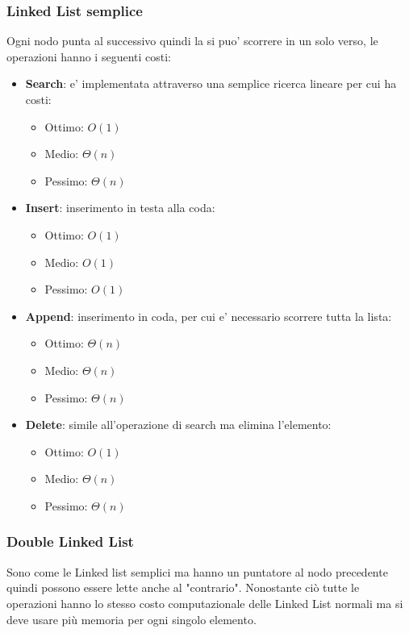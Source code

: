 \documentclass{article}
\begin{document}
\subsubsection{Linked List semplice}
Ogni nodo punta al successivo quindi la si puo' scorrere in un solo verso, le operazioni hanno i seguenti costi: \begin{itemize}
    \item \textbf{Search}: e' implementata attraverso una semplice ricerca lineare per cui ha costi:
    \begin{itemize}
        \item Ottimo: $O(1)$
        \item Medio: $\Theta (n)$
        \item Pessimo: $\Theta(n)$
    \end{itemize}
    \item \textbf{Insert}: inserimento in testa alla coda:
    \begin{itemize}
        \item Ottimo: $O(1)$
        \item Medio: $O(1)$
        \item Pessimo: $O(1)$
        \end{itemize}
    \item \textbf{Append}: inserimento in coda, per cui e' necessario scorrere tutta la lista:
    \begin{itemize}
        \item Ottimo: $\Theta (n)$
        \item Medio: $\Theta (n)$
        \item Pessimo: $\Theta (n)$
        \end{itemize}
    \item \textbf{Delete}: simile all'operazione di search ma elimina l'elemento: 
    \begin{itemize}
        \item Ottimo: $O(1)$
        \item Medio: $\Theta (n)$
        \item Pessimo: $\Theta (n)$
        \end{itemize}

\end{itemize}

\subsubsection{Double Linked List}
Sono come le Linked list semplici ma hanno un puntatore al nodo precedente quindi possono essere lette anche al "contrario". Nonostante ciò tutte le operazioni hanno lo stesso costo computazionale delle Linked List normali ma si deve usare più memoria per ogni singolo elemento.
\end{document}
